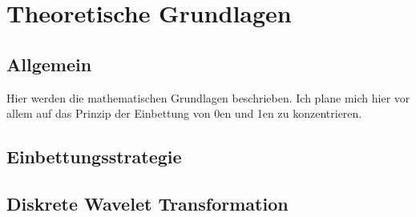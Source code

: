 \chapter{Theoretische Grundlagen}
\label{ch:theorie}

\section{Allgemein}

Hier werden die mathematischen Grundlagen beschrieben. Ich plane mich hier vor allem auf das Prinzip der Einbettung von 0en und 1en zu konzentrieren. 

\section{Einbettungsstrategie}


\section{Diskrete Wavelet Transformation}
